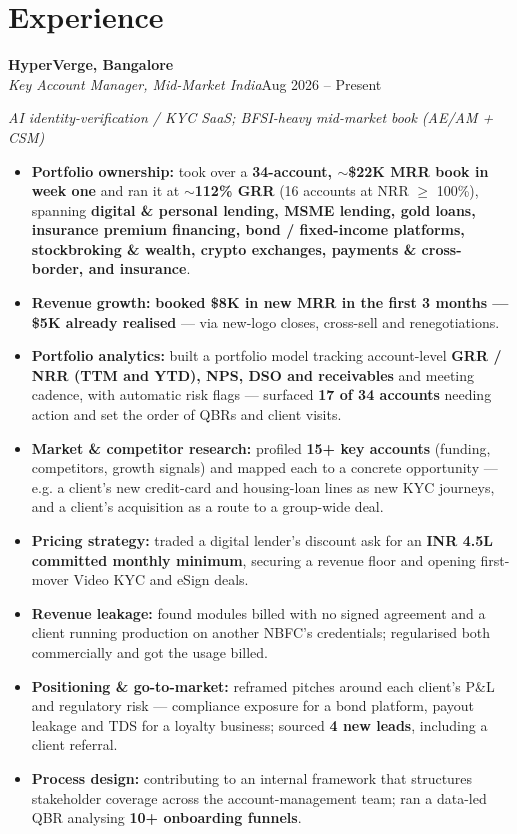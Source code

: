 \documentclass[10pt,a4paper]{article}
\begin{document}
\section*{Experience}
\vspace{1pt}\textbf{HyperVerge, Bangalore}\\
\textit{Key Account Manager, Mid-Market India}\hfill Aug 2026 -- Present\par\vspace{1pt}
{\small\itshape AI identity-verification / KYC SaaS; BFSI-heavy mid-market book (AE/AM + CSM)}\par\vspace{1pt}
\begin{itemize}
\item \textbf{Portfolio ownership:} took over a \textbf{34-account, $\sim$\$22K MRR book in week one} and ran it at \textbf{$\sim$112\% GRR} (16 accounts at NRR $\geq$ 100\%), spanning \textbf{digital \& personal lending, MSME lending, gold loans, insurance premium financing, bond / fixed-income platforms, stockbroking \& wealth, crypto exchanges, payments \& cross-border, and insurance}.
\item \textbf{Revenue growth:} \textbf{booked \$8K in new MRR in the first 3 months --- \$5K already realised} --- via new-logo closes, cross-sell and renegotiations.
\item \textbf{Portfolio analytics:} built a portfolio model tracking account-level \textbf{GRR / NRR (TTM and YTD), NPS, DSO and receivables} and meeting cadence, with automatic risk flags --- surfaced \textbf{17 of 34 accounts} needing action and set the order of QBRs and client visits.
\item \textbf{Market \& competitor research:} profiled \textbf{15+ key accounts} (funding, competitors, growth signals) and mapped each to a concrete opportunity --- e.g. a client's new credit-card and housing-loan lines as new KYC journeys, and a client's acquisition as a route to a group-wide deal.
\item \textbf{Pricing strategy:} traded a digital lender's discount ask for an \textbf{INR 4.5L committed monthly minimum}, securing a revenue floor and opening first-mover Video KYC and eSign deals.
\item \textbf{Revenue leakage:} found modules billed with no signed agreement and a client running production on another NBFC's credentials; regularised both commercially and got the usage billed.
\item \textbf{Positioning \& go-to-market:} reframed pitches around each client's P\&L and regulatory risk --- compliance exposure for a bond platform, payout leakage and TDS for a loyalty business; sourced \textbf{4 new leads}, including a client referral.
\item \textbf{Process design:} contributing to an internal framework that structures stakeholder coverage across the account-management team; ran a data-led QBR analysing \textbf{10+ onboarding funnels}.
\end{itemize}
\end{document}
